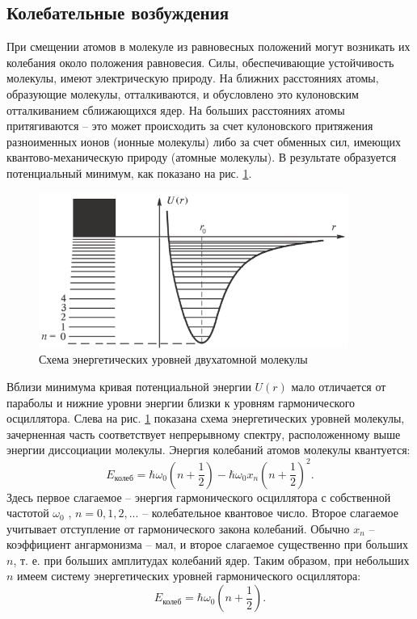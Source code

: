 \documentclass[a4paper,12pt]{article}
\begin{document}
\subsection{Колебательные возбуждения}
При смещении атомов в молекуле из равновесных положений могут возникать их колебания около положения равновесия. Силы, обеспечивающие устойчивость молекулы, имеют электрическую природу. На ближних расстояниях атомы, образующие молекулы, отталкиваются, и обусловлено это кулоновским отталкиванием сближающихся ядер. На больших расстояниях атомы притягиваются -- это может происходить за счет кулоновского притяжения разноименных ионов (ионные молекулы) либо за счет обменных сил, имеющих квантово-механическую природу (атомные молекулы). В результате образуется потенциальный минимум, как показано на рис. \hyperref[fig: Oscillation energy levels]{1}.
\begin{figure}[H]\label{fig: Oscillation energy levels}
    \centering
    \includegraphics[width = 0.9\textwidth]{Oscillation energy levels.png}
    \caption{Схема энергетических уровней двухатомной молекулы}
\end{figure}

Вблизи минимума кривая потенциальной энергии $U(r)$ мало отличается от параболы и нижние уровни энергии близки к уровням гармонического осциллятора. Слева на рис. \hyperref[fig: Oscillation energy levels]{1} показана схема энергетических уровней молекулы, зачерненная часть соответствует непрерывному спектру, расположенному выше энергии диссоциации молекулы. Энергия колебаний атомов молекулы квантуется:
\begin{equation}\label{eq: Oscillation energy}
    E_\text{колеб} = \hbar\omega_0\left(n + \frac{1}{2}\right) - \hbar\omega_0 x_n\left(n + \frac{1}{2}\right)^2.
\end{equation}
Здесь первое слагаемое -- энергия гармонического осциллятора с собственной частотой $\omega_0$ , $n = 0, 1, 2, . . .$ -- колебательное квантовое число. Второе слагаемое учитывает отступление от гармонического закона колебаний. Обычно $x_n$ -- коэффициент ангармонизма -- мал, и второе слагаемое существенно при больших $n$, т. е. при больших амплитудах колебаний ядер. Таким образом, при небольших $n$ имеем систему энергетических уровней гармонического осциллятора:
\begin{equation}\label{eq: Oscillation energy simplified}
    E_\text{колеб} = \hbar\omega_0\left(n + \frac{1}{2}\right).
\end{equation}
\end{document}
